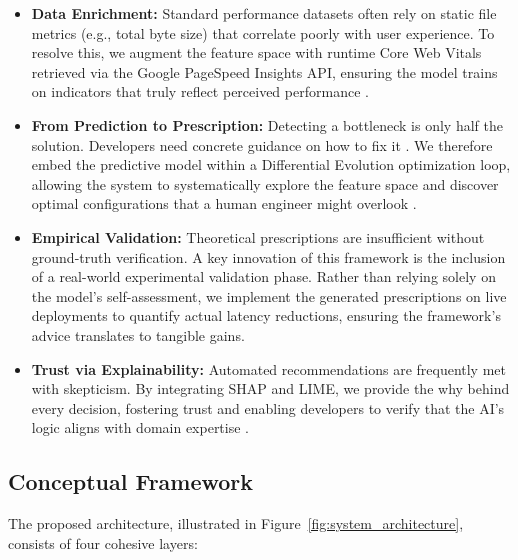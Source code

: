 \documentclass[sn-nature]{sn-jnl}
\begin{document}
\begin{itemize}
    \item \textbf{Data Enrichment:} Standard performance datasets often rely on static file metrics (e.g., total byte size) that correlate poorly with user experience. To resolve this, we augment the feature space with runtime Core Web Vitals retrieved via the Google PageSpeed Insights API, ensuring the model trains on indicators that truly reflect perceived performance \cite{mathur2024}.

    \item \textbf{From Prediction to Prescription:} Detecting a bottleneck is only half the solution. Developers need concrete guidance on how to fix it \cite{vanriet2023}. We therefore embed the predictive model within a Differential Evolution optimization loop, allowing the system to systematically explore the feature space and discover optimal configurations that a human engineer might overlook \cite{notz2024, surianarayanan2023}.

    \item \textbf{Empirical Validation:} Theoretical prescriptions are insufficient without ground-truth verification. A key innovation of this framework is the inclusion of a real-world experimental validation phase. Rather than relying solely on the model's self-assessment, we implement the generated prescriptions on live deployments to quantify actual latency reductions, ensuring the framework's advice translates to tangible gains.

    \item \textbf{Trust via Explainability:} Automated recommendations are frequently met with skepticism. By integrating SHAP and LIME, we provide the why behind every decision, fostering trust and enabling developers to verify that the AI's logic aligns with domain expertise \cite{hassija2024, bennetot2024}.
\end{itemize}

\subsection{Conceptual Framework}

The proposed architecture, illustrated in Figure~\ref{fig:system_architecture}, consists of four cohesive layers:
\end{document}
